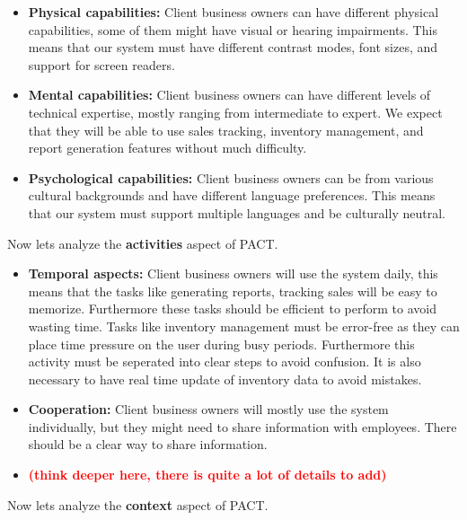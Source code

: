 \documentclass[]{VUMIFTemplateClass}
\begin{document}
\begin{itemize}
    \item \textbf{Physical capabilities:} Client business owners can have
    different physical capabilities, some of them might have visual or hearing
    impairments. This means that our system must have different contrast modes,
    font sizes, and support for screen readers.
    \item \textbf{Mental capabilities:} Client business owners can have
    different levels of technical expertise, mostly ranging from intermediate to
    expert. We expect that they will be able to use sales tracking, inventory
    management, and report generation features without much difficulty.
    \item \textbf{Psychological capabilities:} Client business owners can be
    from various cultural backgrounds and have different language preferences.
    This means that our system must support multiple languages and be culturally
    neutral.
\end{itemize}

Now lets analyze the \textbf{activities} aspect of PACT.

\begin{itemize}
    \item \textbf{Temporal aspects:} Client business owners will use the system
    daily, this means that the tasks like generating reports, tracking sales
    will be easy to memorize. Furthermore these tasks should be efficient to
    perform to avoid wasting time. Tasks like inventory management must be
    error-free as they can place time pressure on the user during busy periods.
    Furthermore this activity must be seperated into clear steps to avoid
    confusion. It is also necessary to have real time update of inventory data
    to avoid mistakes.
    \item \textbf{Cooperation:} Client business owners will mostly use the
    system individually, but they might need to share information with employees.
    There should be a clear way to share information.
    
    \item[] 
    \begin{center}
        \textcolor{red}{\textbf{(think deeper here, there is quite a lot of details to add)}}
    \end{center}


\end{itemize}

Now lets analyze the \textbf{context} aspect of PACT.
\end{document}
